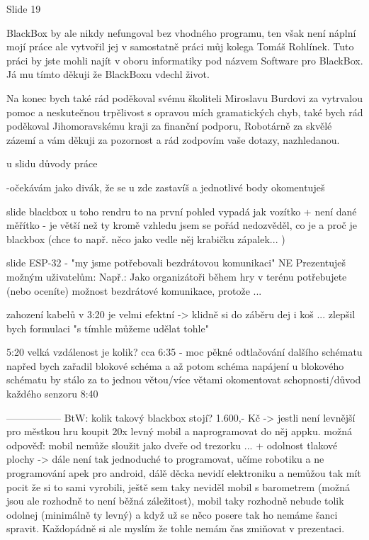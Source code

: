



Slide 19

BlackBox by ale nikdy nefungoval bez vhodného programu, ten však není náplní mojí práce ale vytvořil jej v samostatně 
práci můj kolega Tomáš Rohlínek. Tuto práci by jste mohli najít v oboru informatiky pod názvem Software pro BlackBox.
Já mu tímto děkuji že BlackBoxu vdechl život.

Na konec bych také rád poděkoval svému školiteli Miroslavu Burdovi za vytrvalou pomoc a neskutečnou trpělivost s opravou mích gramatických chyb, 
také bych rád poděkoval Jihomoravskému kraji za finanční podporu, Robotárně za skvělé zázemí 
a vám děkuji za pozornost a rád zodpovím vaše dotazy, nazhledanou.


u slidu důvody práce 

-očekávám jako divák, že se u zde zastavíš a jednotlivé body okomentuješ 


slide blackbox 
u toho rendru to na první pohled vypadá jak vozítko + není dané měřítko - je větší než ty 
kromě vzhledu jsem se pořád nedozvěděl, co je a proč je blackbox 
(chce to např. něco jako vedle něj krabičku zápalek... ) 


slide ESP-32 - "my jsme potřebovali bezdrátovou komunikaci" 
NE 
Prezentuješ možným uživatelům: 
Např.: Jako organizátoři během hry v terénu potřebujete (nebo oceníte) 
možnost bezdrátové komunikace, protože ... 


zahození kabelů v 3:20 je velmi efektní -> klidně si do záběru dej i koš ... 
zlepšil bych formulaci "s tímhle můžeme udělat tohle" %

5:20 velká vzdálenost je kolik? %
cca 6:35 - moc pěkné odtlačování dalšího schématu 
napřed bych zařadil blokové schéma a až potom schéma napájení 
u blokového schématu by stálo za to jednou větou/více větami okomentovat schopnosti/důvod každého senzoru 
8:40  

-----------------
BtW: kolik takový blackbox stojí? 1.600,- Kč -> jestli není levnější 
pro městkou hru koupit 20x levný mobil a naprogramovat do něj appku.    
možná odpověď: mobil nemůže sloužit jako dveře od trezorku ...  + odolnost tlakové plochy -> dále není tak jednoduché to programovat, učíme robotiku a ne programování apek pro android, dálě děcka nevidí elektroniku a nemůžou tak mít pocit že si to sami vyrobili, ještě sem taky neviděl mobil s barometrem (možná jsou ale rozhodně to není běžná záležitost), mobil taky rozhodně nebude tolik odolnej (minimálně ty levný) a když už se něco posere tak ho nemáme šanci spravit. Každopádně si ale myslím že tohle nemám čas zmiňovat v prezentaci.